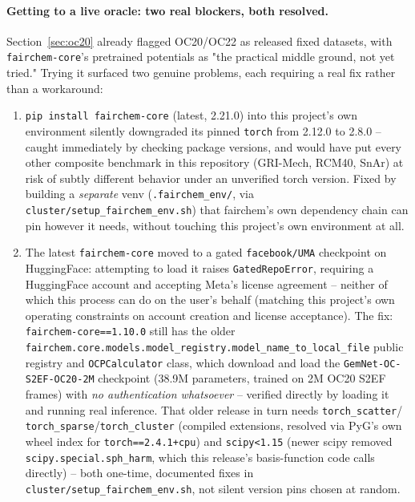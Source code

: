\documentclass[11pt]{article}
\begin{document}
\paragraph{Getting to a live oracle: two real blockers, both resolved.}
Section~\ref{sec:oc20} already flagged OC20/OC22 as released fixed
datasets, with \texttt{fairchem-core}'s pretrained potentials as "the
practical middle ground, not yet tried." Trying it surfaced two genuine
problems, each requiring a real fix rather than a workaround:
\begin{enumerate}
\item \texttt{pip install fairchem-core} (latest, 2.21.0) into this
project's own environment silently downgraded its pinned
\texttt{torch} from 2.12.0 to 2.8.0 -- caught immediately by checking
package versions, and would have put every other composite benchmark
in this repository (GRI-Mech, RCM40, SnAr) at risk of subtly different
behavior under an unverified torch version. Fixed by building a
\emph{separate} venv (\texttt{.fairchem\_env/}, via
\texttt{cluster/setup\_fairchem\_env.sh}) that fairchem's own
dependency chain can pin however it needs, without touching this
project's own environment at all.
\item The latest \texttt{fairchem-core} moved to a gated
\texttt{facebook/UMA} checkpoint on HuggingFace: attempting to load it
raises \texttt{GatedRepoError}, requiring a HuggingFace account and
accepting Meta's license agreement -- neither of which this process
can do on the user's behalf (matching this project's own operating
constraints on account creation and license acceptance). The fix:
\texttt{fairchem-core==1.10.0} still has the older
\texttt{fairchem.core.models.model\_registry.model\_name\_to\_local\_file}
public registry and \texttt{OCPCalculator} class, which download and
load the \texttt{GemNet-OC-S2EF-OC20-2M} checkpoint (38.9M parameters,
trained on 2M OC20 S2EF frames) with \emph{no authentication
whatsoever} -- verified directly by loading it and running real
inference. That older release in turn needs \texttt{torch\_scatter}/
\texttt{torch\_sparse}/\texttt{torch\_cluster} (compiled extensions,
resolved via PyG's own wheel index for \texttt{torch==2.4.1+cpu}) and
\texttt{scipy<1.15} (newer scipy removed \texttt{scipy.special.sph\_harm},
which this release's basis-function code calls directly) -- both
one-time, documented fixes in \texttt{cluster/setup\_fairchem\_env.sh},
not silent version pins chosen at random.
\end{enumerate}
\end{document}

